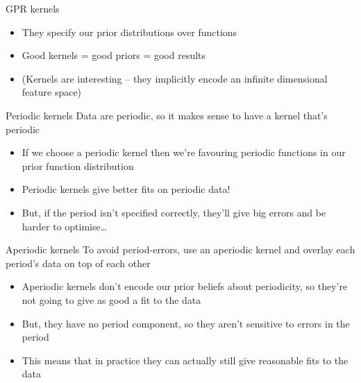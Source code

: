 \documentclass[presentation]{beamer}
\begin{document}
\begin{frame}[label={sec:orgea39bb3}]{GPR kernels}
\begin{itemize}
\item They specify our prior distributions over functions
\item Good kernels = good priors = good results
\item (Kernels are interesting -- they implicitly encode an infinite dimensional feature space)
\end{itemize}
\end{frame}

\begin{frame}[label={sec:org3b7186d}]{Periodic kernels}
Data are periodic, so it makes sense to have a kernel that's periodic 

\begin{itemize}
\item If we choose a periodic kernel then we're favouring periodic functions in our prior function distribution
\item Periodic kernels give better fits on periodic data!
\item But, if the period isn't specified correctly, they'll give big errors and be harder to optimise\ldots{}
\end{itemize}
\end{frame}

\begin{frame}[label={sec:orgb526f10}]{Aperiodic kernels}
To avoid period-errors, use an aperiodic kernel and overlay each period's data on top of each other

\begin{itemize}
\item Aperiodic kernels don't encode our prior beliefs about periodicity, so they're not going to give as good a fit to the data
\item But, they have no period component, so they aren't sensitive to errors in the period
\item This means that in practice they can actually still give reasonable fits to the data
\end{itemize}
\end{frame}
\end{document}
